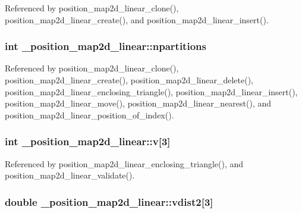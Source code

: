 Referenced by position\+\_\+map2d\+\_\+linear\+\_\+clone(), position\+\_\+map2d\+\_\+linear\+\_\+create(), and position\+\_\+map2d\+\_\+linear\+\_\+insert().

\subsubsection[{\texorpdfstring{npartitions}{npartitions}}]{\setlength{\rightskip}{0pt plus 5cm}int \+\_\+position\+\_\+map2d\+\_\+linear\+::npartitions}\hypertarget{struct__position__map2d__linear_af4bb06ccb30d1e60c30cc2948a70e329}{}\label{struct__position__map2d__linear_af4bb06ccb30d1e60c30cc2948a70e329}


Referenced by position\+\_\+map2d\+\_\+linear\+\_\+clone(), position\+\_\+map2d\+\_\+linear\+\_\+create(), position\+\_\+map2d\+\_\+linear\+\_\+delete(), position\+\_\+map2d\+\_\+linear\+\_\+enclosing\+\_\+triangle(), position\+\_\+map2d\+\_\+linear\+\_\+insert(), position\+\_\+map2d\+\_\+linear\+\_\+move(), position\+\_\+map2d\+\_\+linear\+\_\+nearest(), and position\+\_\+map2d\+\_\+linear\+\_\+position\+\_\+of\+\_\+index().

\subsubsection[{\texorpdfstring{v}{v}}]{\setlength{\rightskip}{0pt plus 5cm}int \+\_\+position\+\_\+map2d\+\_\+linear\+::v\mbox{[}3\mbox{]}}\hypertarget{struct__position__map2d__linear_a96b27ad1b7340512cc10442d85efd945}{}\label{struct__position__map2d__linear_a96b27ad1b7340512cc10442d85efd945}


Referenced by position\+\_\+map2d\+\_\+linear\+\_\+enclosing\+\_\+triangle(), and position\+\_\+map2d\+\_\+linear\+\_\+validate().

\subsubsection[{\texorpdfstring{vdist2}{vdist2}}]{\setlength{\rightskip}{0pt plus 5cm}double \+\_\+position\+\_\+map2d\+\_\+linear\+::vdist2\mbox{[}3\mbox{]}}\hypertarget{struct__position__map2d__linear_a6c26a8cac0ea2225c11ee477bea37e22}{}\label{struct__position__map2d__linear_a6c26a8cac0ea2225c11ee477bea37e22}


